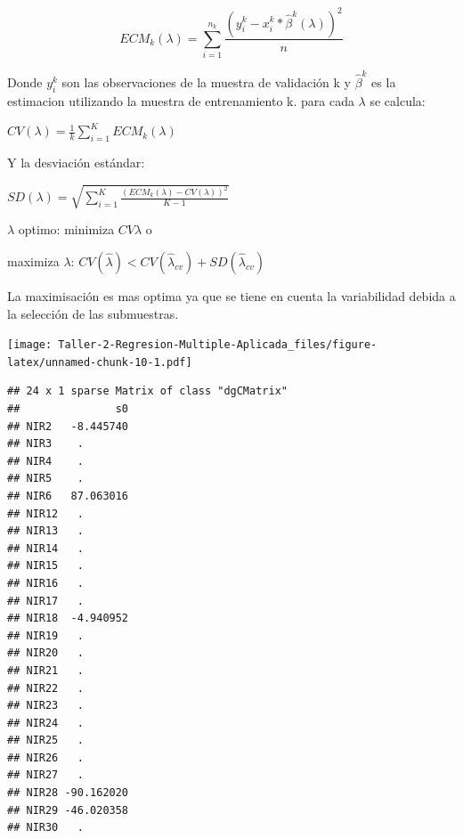 \documentclass[
]{article}
\newenvironment{Shaded}{\begin{snugshade}}{\end{snugshade}}
\newcommand{\AttributeTok}[1]{\textcolor[rgb]{0.77,0.63,0.00}{#1}}
\newcommand{\DecValTok}[1]{\textcolor[rgb]{0.00,0.00,0.81}{#1}}
\newcommand{\FloatTok}[1]{\textcolor[rgb]{0.00,0.00,0.81}{#1}}
\newcommand{\FunctionTok}[1]{\textcolor[rgb]{0.00,0.00,0.00}{#1}}
\newcommand{\NormalTok}[1]{#1}
\newcommand{\OtherTok}[1]{\textcolor[rgb]{0.56,0.35,0.01}{#1}}
\newcommand{\SpecialCharTok}[1]{\textcolor[rgb]{0.00,0.00,0.00}{#1}}
\begin{document}
\[ECM_k(\lambda)= \sum_{i=1}^{n_k}\frac{(y_i^k- x_i^k*\hat{\beta}^k(\lambda))^2}{n}\]

Donde \(y_i^k\) son las observaciones de la muestra de validación k y
\(\hat{\beta}^k\) es la estimacion utilizando la muestra de
entrenamiento k. para cada \(\lambda\) se calcula:

\(CV(\lambda)=\frac{1}{k}\sum_{i=1}^{K}ECM_k(\lambda)\)

Y la desviación estándar:

\(SD(\lambda)=\sqrt{\sum_{i=1}^{K}\frac{(ECM_k(\lambda)-CV(\lambda))^2}{K-1}}\)

\(\lambda\) optimo: minimiza \(CV{\lambda}\) o

maximiza \(\lambda\):
\(CV(\hat{\lambda}) < CV(\hat{\lambda}_{cv})+SD(\hat{\lambda}_{cv})\)

La maximisación es mas optima ya que se tiene en cuenta la variabilidad
debida a la selección de las submuestras.

\begin{Shaded}
\end{Shaded}

\texttt{[image: Taller-2-Regresion-Multiple-Aplicada\_files/figure-latex/unnamed-chunk-10-1.pdf]}

\begin{Shaded}
\end{Shaded}

\begin{verbatim}
## 24 x 1 sparse Matrix of class "dgCMatrix"
##               s0
## NIR2   -8.445740
## NIR3    .       
## NIR4    .       
## NIR5    .       
## NIR6   87.063016
## NIR12   .       
## NIR13   .       
## NIR14   .       
## NIR15   .       
## NIR16   .       
## NIR17   .       
## NIR18  -4.940952
## NIR19   .       
## NIR20   .       
## NIR21   .       
## NIR22   .       
## NIR23   .       
## NIR24   .       
## NIR25   .       
## NIR26   .       
## NIR27   .       
## NIR28 -90.162020
## NIR29 -46.020358
## NIR30   .
\end{verbatim}
\end{document}
